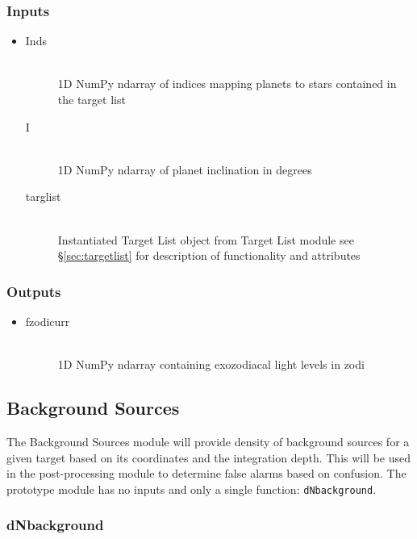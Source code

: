 \documentclass[cleanfoot]{asme2ej}
\begin{document}
\subsubsection*{Inputs}
\begin{itemize}
    \item 
    \begin{description}
        \item[Inds] \hfill \\
        1D NumPy ndarray of indices mapping planets to stars contained in the target list
        \item[I] \hfill \\
        1D NumPy ndarray of planet inclination in degrees
        \item[targlist] \hfill \\
        Instantiated Target List object from Target List module see \S\ref{sec:targetlist} for description of functionality and attributes
    \end{description}
\end{itemize}

\subsubsection*{Outputs}
\begin{itemize}
    \item 
    \begin{description}
        \item[fzodicurr] \hfill \\
        1D NumPy ndarray containing exozodiacal light levels in zodi
    \end{description}
\end{itemize}

\subsection{Background Sources}\label{sec:backgroundsources}

The Background Sources module will provide density of background sources for a given target based on its coordinates and the integration depth.  This will be used in the post-processing module to determine false alarms based on confusion.  The prototype module has no inputs and only a single function: \verb+dNbackground+.

\subsubsection{dNbackground}
\end{document}
